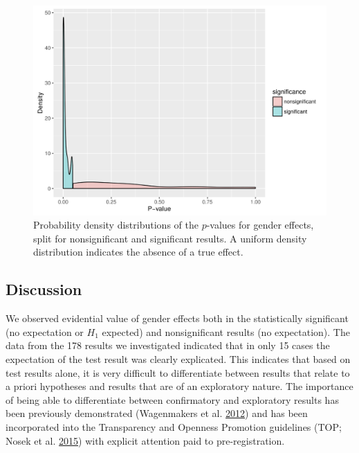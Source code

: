 \documentclass[a5paper]{book}
\begin{document}
\begin{figure}[h]

{\centering \includegraphics[width=1\linewidth]{assets/figures/tgtbf-fig6.pdf.svg} 

}

\caption{Probability density distributions of the $p$-values for gender effects, split for nonsignificant and significant results. A uniform density distribution indicates the absence of a true effect.}\label{fig:tgtbf-fig6}
\end{figure}

\subsection{Discussion}\label{discussion-2}

We observed evidential value of gender effects both in the statistically
significant (no expectation or \(H_1\) expected) and nonsignificant
results (no expectation). The data from the 178 results we investigated
indicated that in only 15 cases the expectation of the test result was
clearly explicated. This indicates that based on test results alone, it
is very difficult to differentiate between results that relate to a
priori hypotheses and results that are of an exploratory nature. The
importance of being able to differentiate between confirmatory and
exploratory results has been previously demonstrated (Wagenmakers et al.
\protect\hyperlink{ref-doi:10.1177ux2f1745691612463078}{2012}) and has
been incorporated into the Transparency and Openness Promotion
guidelines (TOP; Nosek et al.
\protect\hyperlink{ref-doi:10.1126ux2fscience.aab2374}{2015}) with
explicit attention paid to pre-registration.
\end{document}

